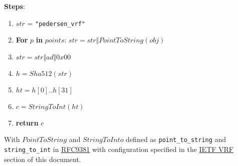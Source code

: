 \documentclass[
]{article}
\providecommand{\tightlist}{%
  \setlength{\itemsep}{0pt}\setlength{\parskip}{0pt}}
\begin{document}
\textbf{Steps}:

\begin{enumerate}
\def\labelenumi{\arabic{enumi}.}
\tightlist
\item
  \(str\) = \texttt{"pedersen\_vrf"}
\item
  \textbf{For} \(p\) \textbf{in} \(points\):
  \(str = str \Vert PointToString(obj)\)
\item
  \(str = str \Vert ad \Vert 0x00\)
\item
  \(h = Sha512(str)\)
\item
  \(ht = h[0] .. h[31]\)
\item
  \(c = StringToInt(ht)\)
\item
  \textbf{return} \(c\)
\end{enumerate}

With \(PointToString\) and \(StringToInto\) defined as
\texttt{point\_to\_string} and \texttt{string\_to\_int} in
\href{https://datatracker.ietf.org/doc/rfc9381/}{RFC9381} with
configuration specified in the \protect\hyperlink{ietf-vrf}{IETF VRF}
section of this document.
\end{document}
